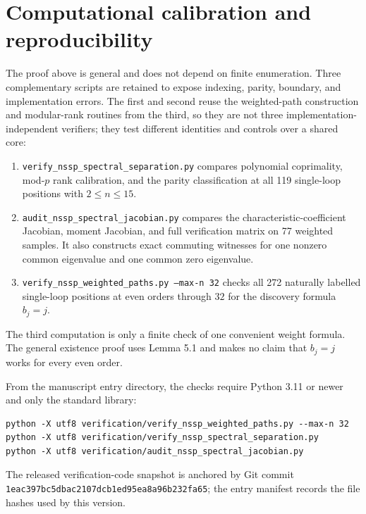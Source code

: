 \documentclass[11pt]{article}
\theoremstyle{remark}
\begin{document}
\section{Computational calibration and reproducibility}


The proof above is general and does not depend on finite enumeration. Three complementary scripts are
retained to expose indexing, parity, boundary, and implementation errors. The first and second reuse the
weighted-path construction and modular-rank routines from the third, so they are not three
implementation-independent verifiers; they test different identities and controls over a shared core:

\begin{enumerate}
\item \texttt{verify\_nssp\_spectral\_separation.py} compares polynomial coprimality, mod-$p$ rank calibration, and
   the parity classification at all 119 single-loop positions with $2\leq n\leq15$.
\item \texttt{audit\_nssp\_spectral\_jacobian.py} compares the characteristic-coefficient Jacobian, moment Jacobian,
   and full verification matrix on 77 weighted samples. It also constructs exact commuting witnesses for
   one nonzero common eigenvalue and one common zero eigenvalue.
\item \texttt{verify\_nssp\_weighted\_paths.py --max-n 32} checks all 272 naturally labelled single-loop positions
   at even orders through $32$ for the discovery formula $b_j=j$.
\end{enumerate}
The third computation is only a finite check of one convenient weight formula. The general existence
proof uses Lemma 5.1 and makes no claim that $b_j=j$ works for every even order.

From the manuscript entry directory, the checks require Python 3.11 or newer and only the standard
library:

\begin{Verbatim}[fontsize=\small,breaklines=true,breakanywhere=true]
python -X utf8 verification/verify_nssp_weighted_paths.py --max-n 32
python -X utf8 verification/verify_nssp_spectral_separation.py
python -X utf8 verification/audit_nssp_spectral_jacobian.py
\end{Verbatim}

The released verification-code snapshot is anchored by Git commit
\texttt{1eac397bc5db\allowbreak ac2107dcb1ed\allowbreak 95ea8a96b232\allowbreak fa65}; the entry manifest records
the file hashes used by this version.
\end{document}
